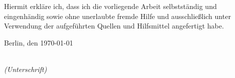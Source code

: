 \newpage

\thispagestyle{empty}

\begin{large}

\vspace*{6cm}

\noindent
Hiermit erkläre ich, dass ich die vorliegende Arbeit selbstständig und eingenhändig sowie ohne unerlaubte fremde Hilfe und ausschließlich unter Verwendung der aufgeführten Quellen und Hilfsmittel angefertigt habe.

\vspace{2cm}

\noindent
Berlin, den \myformat\today

\vspace{3cm}

\hspace*{7cm}%
\dotfill\\
\hspace*{8.5cm}%
\textit{(Unterschrift)}

\end{large}
